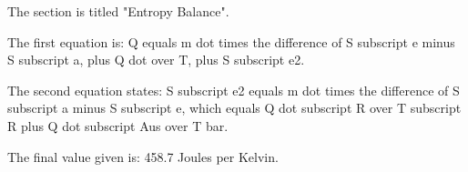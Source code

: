 The section is titled "Entropy Balance".

The first equation is:
Q equals m dot times the difference of S subscript e minus S subscript a, plus Q dot over T, plus S subscript e2.

The second equation states:
S subscript e2 equals m dot times the difference of S subscript a minus S subscript e, which equals Q dot subscript R over T subscript R plus Q dot subscript Aus over T bar.

The final value given is:
458.7 Joules per Kelvin.